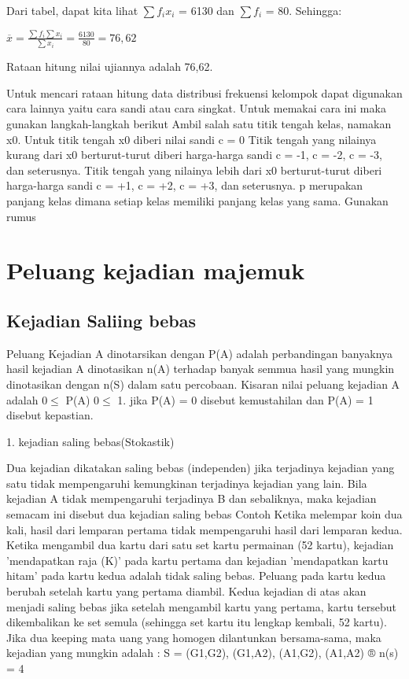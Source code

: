 \documentclass[11pt,fleqn]{book} %
\begin{document}
{Dari tabel, dapat kita lihat $\sum f_{i}x_{i}$  = 6130 dan $\sum f_{i}$  = 80. Sehingga:


$ \overline{x} = \frac{\sum f_{i}\sum x_{i}}{\sum x_{i}} = \frac{6130}{80} = 76,62 $

Rataan hitung nilai ujiannya adalah 76,62.

Untuk mencari rataan hitung data distribusi frekuensi kelompok dapat digunakan cara lainnya yaitu cara sandi atau cara singkat. Untuk memakai cara ini maka gunakan langkah-langkah berikut
	Ambil salah satu titik tengah kelas, namakan x0.
	Untuk titik tengah x0 diberi nilai sandi c = 0
	Titik tengah yang nilainya kurang dari x0 berturut-turut diberi harga-harga sandi c = -1, c = -2, c = -3, dan seterusnya.
	Titik tengah yang nilainya lebih dari x0 berturut-turut diberi harga-harga sandi c = +1, c = +2, c = +3, dan seterusnya.
	p merupakan panjang kelas dimana setiap kelas memiliki panjang kelas yang sama.
Gunakan rumus

\chapter{Peluang kejadian majemuk}
\section{Kejadian Saliing bebas}

Peluang Kejadian A dinotarsikan dengan P(A) adalah perbandingan banyaknya hasil kejadian A dinotasikan n(A) terhadap banyak semmua hasil yang mungkin dinotasikan dengan n(S) dalam satu percobaan. Kisaran nilai peluang kejadian A adalah $0 \leq$ P(A) $0 \leq$ 1. jika P(A) = 0 disebut kemustahilan dan P(A) = 1 disebut kepastian.

1. kejadian saling bebas(Stokastik)

Dua kejadian dikatakan saling bebas (independen) jika terjadinya kejadian yang satu tidak mempengaruhi kemungkinan terjadinya kejadian yang lain. Bila kejadian A tidak mempengaruhi terjadinya B dan sebaliknya, maka kejadian semacam ini disebut dua kejadian saling bebas
Contoh
Ketika melempar koin dua kali, hasil dari lemparan pertama tidak mempengaruhi hasil dari lemparan kedua.
Ketika mengambil dua kartu dari satu set kartu permainan (52 kartu), kejadian 'mendapatkan raja (K)' pada kartu pertama dan kejadian 'mendapatkan kartu hitam' pada kartu kedua adalah tidak saling bebas. Peluang pada kartu kedua berubah setelah kartu yang pertama diambil. Kedua kejadian di atas akan menjadi saling bebas jika setelah mengambil
kartu yang pertama, kartu tersebut dikembalikan ke set semula (sehingga set kartu itu lengkap kembali, 52 kartu).
Jika dua keeping mata uang yang homogen dilantunkan bersama-sama, maka kejadian yang mungkin adalah : S = {(G1,G2), (G1,A2), (A1,G2), (A1,A2)} ® n(s) = 4

}
\end{document}

